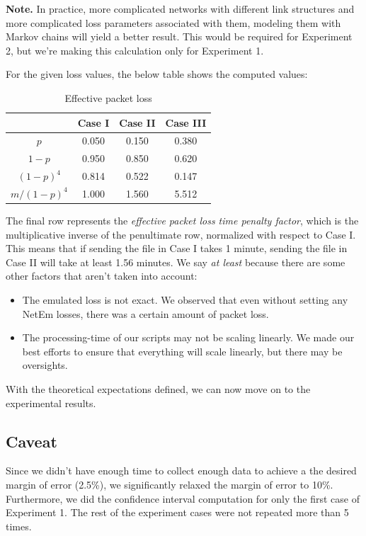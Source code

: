\documentclass[conference]{IEEEtran}
\begin{document}
\textbf{Note.} In practice, more complicated networks with different link structures and more
complicated loss parameters associated with them, modeling them with Markov chains will yield
a better result. This would be required for Experiment 2, but we're making this calculation only
for Experiment 1.

For the given loss values, the below table shows the computed values:

\begin{table}[h]
    \centering
    \renewcommand{\arraystretch}{2.5}
        \begin{tabular}{|c|c|c|c|}
        \hline
                            & Case I & Case II & Case III \\
        \hline
                $p$         & 0.050  & 0.150   & 0.380    \\
        \hline
                $1-p$       & 0.950  & 0.850   & 0.620    \\
        \hline
                $(1-p)^4$   & 0.814  & 0.522   & 0.147    \\
        \hline
                $m/(1-p)^4$ & 1.000  & 1.560   & 5.512    \\
        \hline
        \end{tabular}
    \caption{Effective packet loss}
    \label{table:theoretical}
\end{table}

The final row represents the \textit{effective packet loss time penalty factor}, which is the
multiplicative inverse of the penultimate row, normalized with respect to Case I. This means that
if sending the file in Case I takes 1 minute, sending the file in Case II will take at least
1.56 minutes. We say \textit{at least} because there are some other factors that aren't taken into
account:

\begin{itemize}
    \item The emulated loss is not exact. We observed that even without setting any NetEm losses,
    there was a certain amount of packet loss.
    \item The processing-time of our scripts may not be scaling linearly. We made our best efforts
    to ensure that everything will scale linearly, but there may be oversights.
\end{itemize}

With the theoretical expectations defined, we can now move on to the experimental results.

\subsection{Caveat}
Since we didn't have enough time to collect enough data to achieve a the desired margin of error
(2.5\%), we significantly relaxed the margin of error to 10\%. Furthermore, we did the confidence
interval computation for only the first case of Experiment 1. The rest of the experiment cases
were not repeated more than 5 times.
\end{document}
